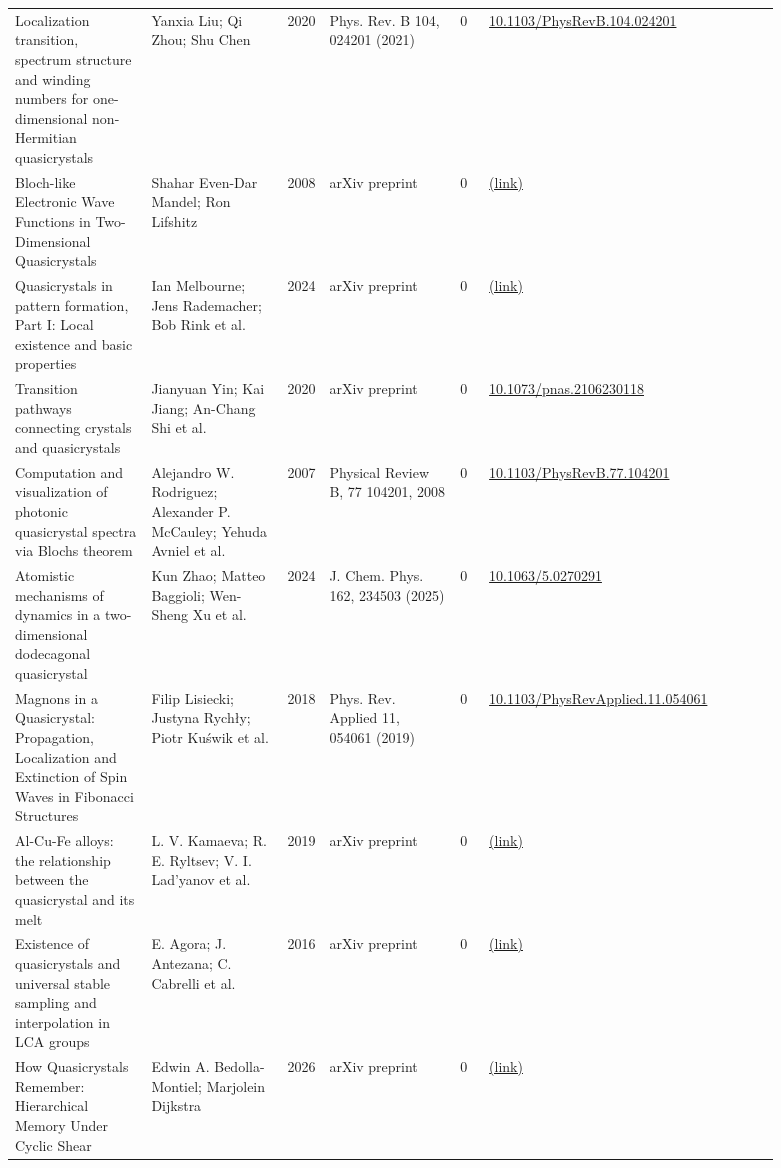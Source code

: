 \documentclass[10pt,a4paper]{article}
\begin{document}
{\begin{longtable}{p{0.192\linewidth}p{0.192\linewidth}p{0.043\linewidth}p{0.192\linewidth}p{0.043\linewidth}p{0.132\linewidth}p{0.096\linewidth}}
Localization transition, spectrum structure and winding numbers for one-dimensional non-Hermitian quasicrystals & Yanxia Liu; Qi Zhou; Shu Chen & 2020 & Phys. Rev. B 104, 024201 (2021) & 0 & \href{https://doi.org/10.1103/PhysRevB.104.024201}{10.1103/PhysRevB.104.024201} &  \\
Bloch-like Electronic Wave Functions in Two-Dimensional Quasicrystals & Shahar Even-Dar Mandel; Ron Lifshitz & 2008 & arXiv preprint & 0 & \href{http://arxiv.org/abs/0808.3659v1}{(link)} &  \\
Quasicrystals in pattern formation, Part I: Local existence and basic properties & Ian Melbourne; Jens Rademacher; Bob Rink et al. & 2024 & arXiv preprint & 0 & \href{http://arxiv.org/abs/2410.19967v2}{(link)} &  \\
Transition pathways connecting crystals and quasicrystals & Jianyuan Yin; Kai Jiang; An-Chang Shi et al. & 2020 & arXiv preprint & 0 & \href{https://doi.org/10.1073/pnas.2106230118}{10.1073/pnas.2106230118} &  \\
Computation and visualization of photonic quasicrystal spectra via Blochs theorem & Alejandro W. Rodriguez; Alexander P. McCauley; Yehuda Avniel et al. & 2007 & Physical Review B, 77 104201, 2008 & 0 & \href{https://doi.org/10.1103/PhysRevB.77.104201}{10.1103/PhysRevB.77.104201} &  \\
Atomistic mechanisms of dynamics in a two-dimensional dodecagonal quasicrystal & Kun Zhao; Matteo Baggioli; Wen-Sheng Xu et al. & 2024 & J. Chem. Phys. 162, 234503 (2025) & 0 & \href{https://doi.org/10.1063/5.0270291}{10.1063/5.0270291} &  \\
Magnons in a Quasicrystal: Propagation, Localization and Extinction of Spin Waves in Fibonacci Structures & Filip Lisiecki; Justyna Rychły; Piotr Kuświk et al. & 2018 & Phys. Rev. Applied 11, 054061 (2019) & 0 & \href{https://doi.org/10.1103/PhysRevApplied.11.054061}{10.1103/PhysRevApplied.11.054061} &  \\
Al-Cu-Fe alloys: the relationship between the quasicrystal and its melt & L. V. Kamaeva; R. E. Ryltsev; V. I. Lad'yanov et al. & 2019 & arXiv preprint & 0 & \href{http://arxiv.org/abs/1908.03931v1}{(link)} &  \\
Existence of quasicrystals and universal stable sampling and interpolation in LCA groups & E. Agora; J. Antezana; C. Cabrelli et al. & 2016 & arXiv preprint & 0 & \href{http://arxiv.org/abs/1611.05804v2}{(link)} &  \\
How Quasicrystals Remember: Hierarchical Memory Under Cyclic Shear & Edwin A. Bedolla-Montiel; Marjolein Dijkstra & 2026 & arXiv preprint & 0 & \href{http://arxiv.org/abs/2607.12674v1}{(link)} &  \\

\end{longtable}}
\end{document}
